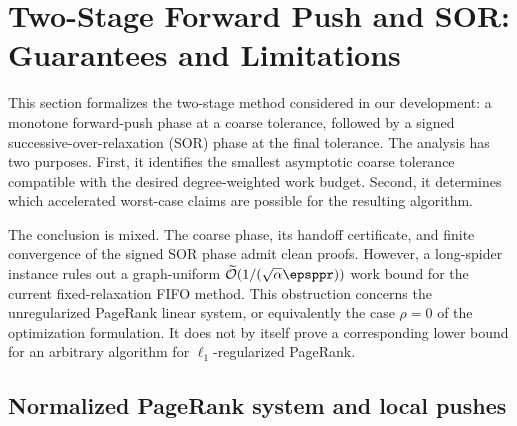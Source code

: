 %
%   
%

\section{Two-Stage Forward Push and SOR: Guarantees and Limitations}
\label{sec:cf-push-analysis}
\label{sec:algorithm}

This section formalizes the two-stage method considered in our development:
a monotone forward-push phase at a coarse tolerance, followed by a signed
successive-over-relaxation (SOR) phase at the final tolerance.  The analysis
has two purposes.  First, it identifies the smallest asymptotic coarse
tolerance compatible with the desired degree-weighted work budget.  Second,
it determines which accelerated worst-case claims are possible for the
resulting algorithm.

The conclusion is mixed.  The coarse phase, its handoff certificate, and
finite convergence of the signed SOR phase admit clean proofs.  However, a
long-spider instance rules out a graph-uniform
\(\widetilde{\mathcal O}(1/(\sqrt{\alpha}\epsppr))\) work bound for the
current fixed-relaxation FIFO method.  This obstruction concerns the
unregularized PageRank linear system, or equivalently the case \(\rho=0\) of
the optimization formulation.  It does not by itself prove a corresponding
lower bound for an arbitrary algorithm for \(\ell_1\)-regularized PageRank.

\subsection{Normalized PageRank system and local pushes}
\label{subsec:cf-setup}

